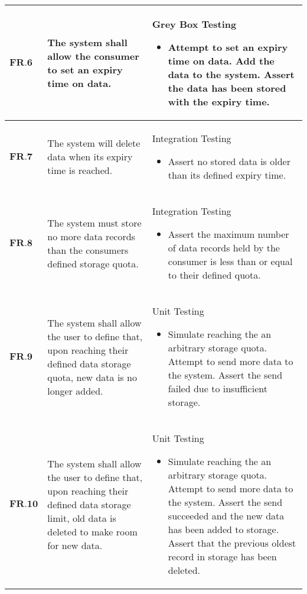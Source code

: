 \begin{longtable}[H]{| p{1.5cm} | p{4.5cm} | p{10.5cm}| }
        $\textbf{FR.6} $ & The system shall allow the consumer to set an expiry time on data.                                                                             & Grey Box Testing\begin{itemize} \item Attempt to set an expiry time on data. Add the data to the system. Assert the data has been stored with the expiry time.\end{itemize}                                                                                                         \\ \hline
       $ \textbf{FR.7} $ & The system will delete data when its expiry time is reached.                                                                                   & Integration Testing\begin{itemize} \item Assert no stored data is older than its defined expiry time.\end{itemize}                                                                                                                                                                  \\ \hline
        $\textbf{FR.8}$  & The system must store no more data records than the consumers defined storage quota.                                                           & Integration Testing\begin{itemize} \item Assert the maximum number of data records held by the consumer is less than or equal to their defined quota.\end{itemize}                                                                                                                  \\ \hline
        $\textbf{FR.9} $ & The system shall allow the user to define that, upon reaching their defined data storage quota, new data is no longer added.                   & Unit Testing\begin{itemize} \item Simulate reaching the an arbitrary storage quota. Attempt to send more data to the system. Assert the send failed due to insufficient storage.\end{itemize}                                                                                       \\ \hline
    	$\textbf{FR.10}$ & The system shall allow the user to define that, upon reaching their defined data storage limit, old data is deleted to make room for new data. & Unit Testing\begin{itemize} \item Simulate reaching the an arbitrary storage quota. Attempt to send more data to the system. Assert the send succeeded and the new data has been added to storage. Assert that the previous oldest record in storage has been deleted.\end{itemize} \\ \hline
\end{longtable}

